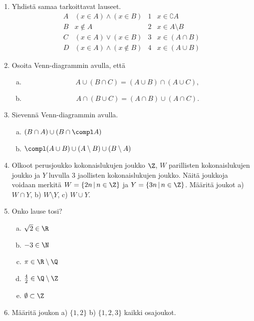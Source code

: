 \begin{enumerate}
\item Yhdistä samaa tarkoittavat lauseet.
\[
\begin{array}{llll}
A & (x\in A)\land (x\in B) & 1 & x\in \complement A \\
B & x\notin A & 2 & x \in A\setminus B \\
C & (x\in A)\lor (x\in B) & 3 & x\in (A\cap B) \\
D & (x\in A)\land (x\notin B) & 4 & x\in (A\cup B)
\end{array}
\]

\item Osoita Venn-diagrammin avulla, että
\begin{enumerate}[a)]
\item 
\[
A\cup (B \cap C) = (A\cup B)\cap(A\cup C),
\]
\item 
\[
A\cap (B \cup C) = (A\cap B)\cup(A\cap C).
\]
\end{enumerate}

\item Sievennä Venn-diagrammin avulla.
\begin{enumerate}[a)]
\item $(B\cap A) \cup (B \cap \compl A)$
\item $\compl (A\cup B) \cup (A \setminus B) \cup (B \setminus A)$
\end{enumerate}

\item
Olkoot perusjoukko kokonaislukujen joukko $\Z$, $W$ parillisten kokonaislukujen joukko ja $Y$ luvulla $3$ jaollisten kokonaislukujen joukko. Näitä joukkoja voidaan merkitä $W = \{2n\,|\, n\in\Z\}$ ja $Y = \{3n \,|\, n \in \Z\}$. Määritä joukot a) $W \cap Y$, b) $W \setminus Y$, c) $W \cup Y$.

\item Onko lause tosi?
\begin{enumerate}[a)]
\item $\sqrt{2} \in \R$
\item $-3 \in \N$
\item $\pi \in \R \setminus \Q$
\item $\frac{4}{2} \in \Q \setminus \Z$
\item $\emptyset \subset \Z$
\end{enumerate}

\item Määritä joukon a) $\{1, 2\}$ b) $\{1, 2, 3\}$ kaikki osajoukot.

\newpage


\end{enumerate}
